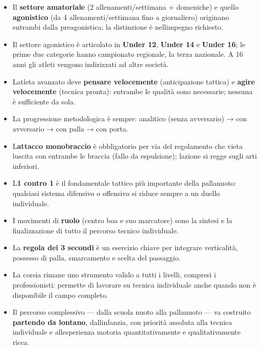 \documentclass[a4paper,11pt]{article}
\providecommand{\tightlist}{%
  \setlength{\itemsep}{0pt}\setlength{\parskip}{0pt}}
\begin{document}
\begin{itemize}
      \tightlist
      \item
            Il \textbf{settore amatoriale} (2 allenamenti/settimana + domeniche) e
            quello \textbf{agonistico} (da 4 allenamenti/settimana fino a
            giornaliero) originano entrambi dalla preagonistica; la distinzione è
            nell\textquotesingle impegno richiesto.
      \item
            Il settore agonistico è articolato in \textbf{Under 12}, \textbf{Under
                  14} e \textbf{Under 16}; le prime due categorie hanno campionato
            regionale, la terza nazionale. A 16 anni gli atleti vengono
            indirizzati ad altre società.
      \item
            L\textquotesingle atleta avanzato deve \textbf{pensare velocemente}
            (anticipazione tattica) e \textbf{agire velocemente} (tecnica pronta):
            entrambe le qualità sono necessarie; nessuna è sufficiente da sola.
      \item
            La progressione metodologica è sempre: analitico (senza avversario) →
            con avversario → con palla → con porta.
      \item
            L\textquotesingle{}\textbf{attacco monobraccio} è obbligatorio per via
            del regolamento che vieta l\textquotesingle uscita con entrambe le
            braccia (fallo da espulsione); l\textquotesingle azione si regge sugli
            arti inferiori.
      \item
            L\textquotesingle{}\textbf{1 contro 1} è il fondamentale tattico più
            importante della pallanuoto: qualsiasi sistema difensivo o offensivo
            si riduce sempre a un duello individuale.
      \item
            I movimenti di \textbf{ruolo} (centro boa e suo marcatore) sono la
            sintesi e la finalizzazione di tutto il percorso tecnico individuale.
      \item
            La \textbf{regola dei 3 secondi} è un esercizio chiave per integrare
            verticalità, possesso di palla, smarcamento e scelta del passaggio.
      \item
            La corsia rimane uno strumento valido a tutti i livelli, compresi i
            professionisti: permette di lavorare su tecnica individuale anche
            quando non è disponibile il campo completo.
      \item
            Il percorso complessivo --- dalla scuola nuoto alla pallanuoto --- va
            costruito \textbf{partendo da lontano}, dall\textquotesingle infanzia,
            con priorità assoluta alla tecnica individuale e
            all\textquotesingle esperienza motoria quantitativamente e
            qualitativamente ricca.
\end{itemize}
\end{document}
